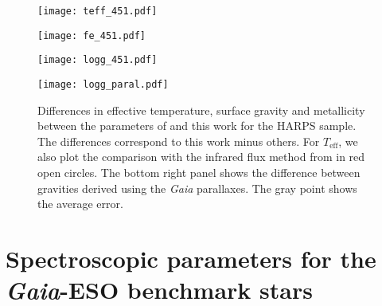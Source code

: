 \documentclass[fleqn,usenatbib]{mnras}
\begin{document}
\begin{figure*}
\centering
\begin{minipage}{0.5\textwidth}
  \centering
  \texttt{[image: teff\_451.pdf]} 
\end{minipage}
\hspace{-0.03\textwidth}%
\begin{minipage}{0.5\textwidth}
  \centering
  \texttt{[image: fe\_451.pdf]} 
\end{minipage}
\begin{minipage}{0.5\textwidth}
  \centering
  \texttt{[image: logg\_451.pdf]} 
\end{minipage}
\hspace{-0.01\textwidth}%
\begin{minipage}{0.5\textwidth}
  \centering
  \texttt{[image: logg\_paral.pdf]} 
\end{minipage}
\caption{Differences in effective temperature, surface gravity and metallicity between the parameters of \citet[][TS2013]{tsantaki13} and this work for the HARPS sample. 
The differences correspond to this work minus others. For $T_{\mathrm{eff}}$, we also plot the comparison with the infrared flux method from \citet[][CA2011]{Casagrande2011} in red open circles.
The bottom right panel shows the difference between gravities derived using the \textit{Gaia} parallaxes. The gray point shows the average error.}
\label{451_fig}
\end{figure*}
 
\section{Spectroscopic parameters for the \textit{Gaia}-ESO benchmark stars}\label{results}
\end{document}
